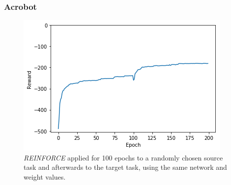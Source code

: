 \subsubsection{Acrobot} %
\label{ssub:reinforce_source_target:acrobot}
\begin{figure}[H]
    \centering
    \includegraphics[width=.8\linewidth]{images/results/Acrobot/reinforce_2tasks.png}
    \caption{\textit{REINFORCE} applied for 100 epochs to a randomly chosen source task and afterwards to the target task, using the same network and weight values.}
    \label{fig:Acrobot:reward_reinforce_2tasks}
\end{figure}
